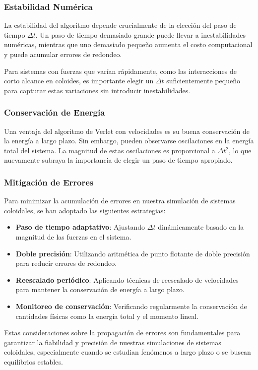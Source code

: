 \documentclass[twocolumn]{article}
\begin{document}
\subsubsection*{Estabilidad Numérica}
La estabilidad del algoritmo depende crucialmente de la elección del paso de tiempo $\Delta t$. Un paso de tiempo demasiado grande puede llevar a inestabilidades numéricas, mientras que uno demasiado pequeño aumenta el costo computacional y puede acumular errores de redondeo.

Para sistemas con fuerzas que varían rápidamente, como las interacciones de corto alcance en coloides, es importante elegir un $\Delta t$ suficientemente pequeño para capturar estas variaciones sin introducir inestabilidades.

\subsubsection*{Conservación de Energía}
Una ventaja del algoritmo de Verlet con velocidades es su buena conservación de la energía a largo plazo. Sin embargo, pueden observarse oscilaciones en la energía total del sistema. La magnitud de estas oscilaciones es proporcional a $\Delta t^2$, lo que nuevamente subraya la importancia de elegir un paso de tiempo apropiado.

\subsubsection*{Mitigación de Errores}
Para minimizar la acumulación de errores en nuestra simulación de sistemas coloidales, se han adoptado las siguientes estrategias:

\begin{itemize}
    \item \textbf{Paso de tiempo adaptativo}: Ajustando $\Delta t$ dinámicamente basado en la magnitud de las fuerzas en el sistema.
    \item \textbf{Doble precisión}: Utilizando aritmética de punto flotante de doble precisión para reducir errores de redondeo.
    \item \textbf{Reescalado periódico}: Aplicando técnicas de reescalado de velocidades para mantener la conservación de energía a largo plazo.
    \item \textbf{Monitoreo de conservación}: Verificando regularmente la conservación de cantidades físicas como la energía total y el momento lineal.
\end{itemize}

Estas consideraciones sobre la propagación de errores son fundamentales para garantizar la fiabilidad y precisión de nuestras simulaciones de sistemas coloidales, especialmente cuando se estudian fenómenos a largo plazo o se buscan equilibrios estables.
\end{document}

